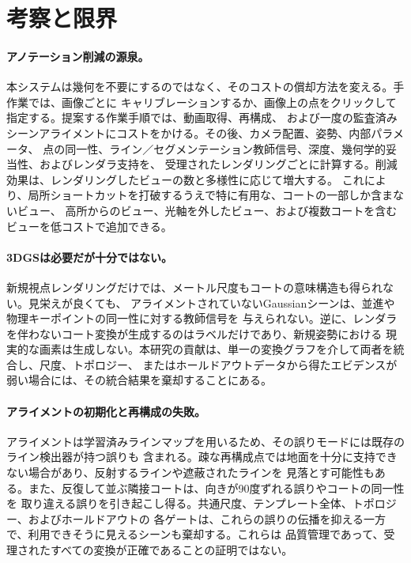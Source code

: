 \section{考察と限界}
\label{sec:discussion}

\paragraph{アノテーション削減の源泉。}
本システムは幾何を不要にするのではなく、そのコストの償却方法を変える。手作業では、画像ごとに
キャリブレーションするか、画像上の点をクリックして指定する。提案する作業手順では、動画取得、再構成、
および一度の監査済みシーンアライメントにコストをかける。その後、カメラ配置、姿勢、内部パラメータ、
点の同一性、ライン／セグメンテーション教師信号、深度、幾何学的妥当性、およびレンダラ支持を、
受理されたレンダリングごとに計算する。削減効果は、レンダリングしたビューの数と多様性に応じて増大する。
これにより、局所ショートカットを打破するうえで特に有用な、コートの一部しか含まないビュー、
高所からのビュー、光軸を外したビュー、および複数コートを含むビューを低コストで追加できる。

\paragraph{3DGSは必要だが十分ではない。}
新規視点レンダリングだけでは、メートル尺度もコートの意味構造も得られない。見栄えが良くても、
アライメントされていないGaussianシーンは、並進や物理キーポイントの同一性に対する教師信号を
与えられない。逆に、レンダラを伴わないコート変換が生成するのはラベルだけであり、新規姿勢における
現実的な画素は生成しない。本研究の貢献は、単一の変換グラフを介して両者を統合し、尺度、トポロジー、
またはホールドアウトデータから得たエビデンスが弱い場合には、その統合結果を棄却することにある。

\paragraph{アライメントの初期化と再構成の失敗。}
アライメントは学習済みラインマップを用いるため、その誤りモードには既存のライン検出器が持つ誤りも
含まれる。疎な再構成点では地面を十分に支持できない場合があり、反射するラインや遮蔽されたラインを
見落とす可能性もある。また、反復して並ぶ隣接コートは、向きが90度ずれる誤りやコートの同一性を
取り違える誤りを引き起こし得る。共通尺度、テンプレート全体、トポロジー、およびホールドアウトの
各ゲートは、これらの誤りの伝播を抑える一方で、利用できそうに見えるシーンも棄却する。これらは
品質管理であって、受理されたすべての変換が正確であることの証明ではない。

